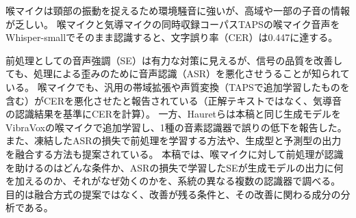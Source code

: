\documentclass[xelatex,ja=standard,a4paper,twocolumn,10pt]{bxjsarticle}
\makeatletter
\renewcommand{\section}{\@startsection{section}{1}{\z@}{1.0ex plus .3ex}{.5ex}{\normalfont\large\sffamily\bfseries}}
\makeatother
\begin{document}

\section{はじめに}
喉マイクは頸部の振動を捉えるため環境騒音に強いが、高域や一部の子音の情報が乏しい。
喉マイクと気導マイクの同時収録コーパスTAPS\cite{taps}の喉マイク音声をWhisper-small\cite{whisper}でそのまま認識すると、文字誤り率（CER）は0.447に達する。

前処理としての音声強調（SE）は有力な対策に見えるが、信号の品質を改善しても、処理による歪みのために音声認識（ASR）を悪化させうることが知られている\cite{ochiai2024}。
喉マイクでも、汎用の帯域拡張や声質変換（TAPSで追加学習したものを含む）がCERを悪化させたと報告されている（正解テキストではなく、気導音の認識結果を基準にCERを計算）\cite{yamanaka2026}。
一方、Hauretら\cite{hauret2025rt}は本稿と同じ生成モデルをVibraVoxの喉マイクで追加学習し、1種の音素認識器で誤りの低下を報告した。
また、凍結したASRの損失で前処理を学習する方法\cite{dissen2024}や、生成型と予測型の出力を融合する方法\cite{shi2024}も提案されている。
本稿では、喉マイクに対して前処理が認識を助けるのはどんな条件か、ASRの損失で学習したSEが生成モデルの出力に何を加えるのか、それがなぜ効くのかを、系統の異なる複数の認識器で調べる。
目的は融合方式の提案ではなく、改善が残る条件と、その改善に関わる成分の分析である。
\end{document}
